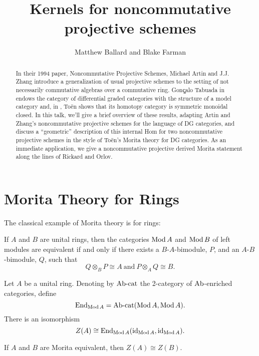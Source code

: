 \documentclass[reqno, 12pt]{amsart}
\title[Noncommutative kernels]{Kernels for noncommutative projective schemes}
\author{Matthew Ballard and Blake Farman}
\begin{document}
\begin{abstract}
  In their 1994 paper, Noncommutative Projective Schemes, Michael Artin and J.J. Zhang introduce a generalization of usual projective schemes to the setting of not necessarily commutative algebras over a commutative ring. Gon\c{ç}alo Tabuada in \cite{Tab05} endows the category of differential graded categories with the structure of a model category and, in \cite{Toen}, Toën shows that its homotopy category is symmetric monoidal closed. In this talk, we’ll give a brief overview of these results, adapting Artin and Zhang’s noncommutative projective schemes for the language of DG categories, and discuss a “geometric” description of this internal Hom for two noncommutative projective schemes in the style of To\"en's Morita theory for DG categories.
  As an immediate application, we give a noncommutative projective derived Morita statement along the lines of Rickard and Orlov.
\end{abstract}

\maketitle

\section{Morita Theory  for Rings} \label{section: Morita for Rings}
The classical example of Morita theory is for rings:

\begin{theorem}\label{thm: Morita}
  If $A$ and $B$ are unital rings, then the categories $\operatorname{Mod}A$ and $\operatorname{Mod}B$ of left modules are equivalent if and only if there exists a $B$-$A$-bimodule, $P$, and an $A$-$B$-bimodule, $Q$, such that
  $$Q \otimes_B P \cong A\ \text{and}\ P \otimes_A Q \cong B.$$
\end{theorem}

\begin{lemma}\label{lem: endomorphisms of identity functor are the center}
  Let $A$ be a unital ring.
  Denoting by $\operatorname{Ab-cat}$ the 2-category of \newline$\operatorname{Ab}$-enriched categories, define 
  $$\operatorname{End}_{\operatorname{Mod}A} = \operatorname{Ab-cat}(\operatorname{Mod}A,\operatorname{Mod}A).$$
There is an isomorphism
$$Z(A) \cong \operatorname{End}_{\operatorname{Mod}A}(\operatorname{id}_{\operatorname{Mod}A}, \operatorname{id}_{\operatorname{Mod}A}).$$
\end{lemma}

\begin{corollary}\label{cor: morita implies isomorphic centers}
  If $A$ and $B$ are Morita equivalent, then $Z(A) \cong Z(B)$.
\end{corollary}
\end{document}
